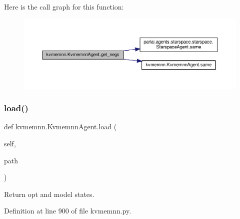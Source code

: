 Here is the call graph for this function\+:
\nopagebreak
\begin{figure}[H]
\begin{center}
\leavevmode
\includegraphics[width=350pt]{classkvmemnn_1_1KvmemnnAgent_aef9979d74efe7a62ac7d4dc8cc661e30_cgraph}
\end{center}
\end{figure}
\mbox{\label{classkvmemnn_1_1KvmemnnAgent_a4a7c16982a6d0364a6f7eca56734ee0b}} 
\subsubsection{\texorpdfstring{load()}{load()}}
{\footnotesize\ttfamily def kvmemnn.\+Kvmemnn\+Agent.\+load (\begin{DoxyParamCaption}\item[{}]{self,  }\item[{}]{path }\end{DoxyParamCaption})}

\begin{DoxyVerb}Return opt and model states.\end{DoxyVerb}
 

Definition at line 900 of file kvmemnn.\+py.



